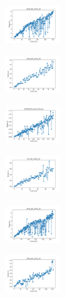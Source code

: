 \begin{figure}[H]
\begin{subfigure}
        \centering
        \includegraphics[width=0.234\textwidth]{img/bl/ecoli_set_const_10_589741062_time.png}
    \end{subfigure}
    \hfill
    \begin{subfigure}
        \centering
        \includegraphics[width=0.234\textwidth]{img/bl/rand_set_const_10_589741062_time.png}
    \end{subfigure}
    \hfill
    \begin{subfigure}
        \centering
        \includegraphics[width=0.234\textwidth]{img/bl/newthyroid_set_const_10_589741062_time.png}
    \end{subfigure}
    \hfill
    \begin{subfigure}
        \centering
        \includegraphics[width=0.234\textwidth]{img/bl/iris_set_const_10_277451237_time.png}
    \end{subfigure}
    \hfill
    \begin{subfigure}
        \centering
        \includegraphics[width=0.234\textwidth]{img/bl/ecoli_set_const_10_277451237_time.png}
    \end{subfigure}
    \hfill
    \begin{subfigure}
        \centering
        \includegraphics[width=0.234\textwidth]{img/bl/rand_set_const_10_277451237_time.png}

\end{subfigure}
\end{figure}
